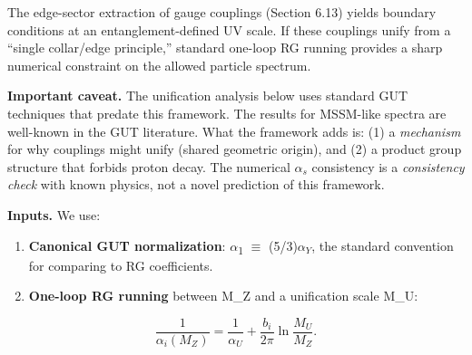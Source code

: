 \documentclass[11pt,a4paper]{article}
\theoremstyle{remark}
\begin{document}
The edge-sector extraction of gauge couplings (Section 6.13) yields boundary
conditions at an entanglement-defined UV scale. If these couplings unify from a
``single collar/edge principle,'' standard one-loop RG running provides a sharp
numerical constraint on the allowed particle spectrum.

\textbf{Important caveat.} The unification analysis below uses standard GUT
techniques that predate this framework. The results for MSSM-like spectra
are well-known in the GUT literature. What the framework adds is:
(1) a \emph{mechanism} for why couplings might unify (shared geometric origin),
and (2) a product group structure that forbids proton decay. The numerical
\(\alpha_s\) consistency is a \emph{consistency check} with known physics, not a
novel prediction of this framework.

\textbf{Inputs.} We use:

\begin{enumerate}
\def\labelenumi{\arabic{enumi}.}
\item
  \textbf{Canonical GUT normalization}: \ensuremath{\alpha}\textsubscript{1} \ensuremath{\equiv} (5/3)\(\alpha_Y\), the
  standard convention for comparing to RG coefficients.
\item
  \textbf{One-loop RG running} between M\_Z and a unification scale M\_U:
\end{enumerate}

\[
   \frac{1}{\alpha_i(M_Z)} = \frac{1}{\alpha_U} + \frac{b_i}{2\pi}
   \ln\frac{M_U}{M_Z}.
\]
\end{document}
